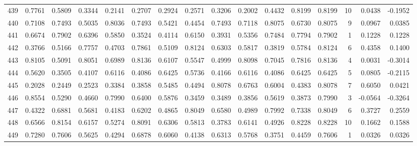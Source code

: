 \begin{tabular}{lrrrrrrrrrrrrrrr}
439 &      0.7761 &  0.5809 &  0.3344 &  0.2141 &  0.2707 &  0.2924 &  0.2571 &  0.3206 &  0.2002 &  0.4432 &   0.8199 &     0.8199 &     10 &                    0.0438 &                    -0.1952 \\
440 &      0.7108 &  0.7493 &  0.5035 &  0.8036 &  0.7493 &  0.5421 &  0.4454 &  0.7493 &  0.7118 &  0.8075 &   0.6730 &     0.8075 &      9 &                    0.0967 &                     0.0385 \\
441 &      0.6674 &  0.7902 &  0.6396 &  0.5850 &  0.3524 &  0.4114 &  0.6150 &  0.3931 &  0.5356 &  0.7484 &   0.7794 &     0.7902 &      1 &                    0.1228 &                     0.1228 \\
442 &      0.3766 &  0.5166 &  0.7757 &  0.4703 &  0.7861 &  0.5109 &  0.8124 &  0.6303 &  0.5817 &  0.3819 &   0.5784 &     0.8124 &      6 &                    0.4358 &                     0.1400 \\
443 &      0.8105 &  0.5091 &  0.8051 &  0.6989 &  0.8136 &  0.6107 &  0.5547 &  0.4999 &  0.8098 &  0.7045 &   0.7816 &     0.8136 &      4 &                    0.0031 &                    -0.3014 \\
444 &      0.5620 &  0.3505 &  0.4107 &  0.6116 &  0.4086 &  0.6425 &  0.5736 &  0.4166 &  0.6116 &  0.4086 &   0.6425 &     0.6425 &      5 &                    0.0805 &                    -0.2115 \\
445 &      0.2028 &  0.2449 &  0.2523 &  0.3384 &  0.3858 &  0.5485 &  0.4494 &  0.8078 &  0.6763 &  0.6004 &   0.4383 &     0.8078 &      7 &                    0.6050 &                     0.0421 \\
446 &      0.8554 &  0.5290 &  0.4660 &  0.7990 &  0.6400 &  0.5876 &  0.3459 &  0.3489 &  0.3856 &  0.5619 &   0.3873 &     0.7990 &      3 &                   -0.0564 &                    -0.3264 \\
447 &      0.4322 &  0.6881 &  0.5681 &  0.4183 &  0.6202 &  0.4865 &  0.8049 &  0.6580 &  0.4989 &  0.7992 &   0.7338 &     0.8049 &      6 &                    0.3727 &                     0.2559 \\
448 &      0.6566 &  0.8154 &  0.6157 &  0.5274 &  0.8091 &  0.6306 &  0.5813 &  0.3783 &  0.6141 &  0.4926 &   0.8228 &     0.8228 &     10 &                    0.1662 &                     0.1588 \\
449 &      0.7280 &  0.7606 &  0.5625 &  0.4294 &  0.6878 &  0.6060 &  0.4138 &  0.6313 &  0.5768 &  0.3751 &   0.4459 &     0.7606 &      1 &                    0.0326 &                     0.0326 \\

\end{tabular}
